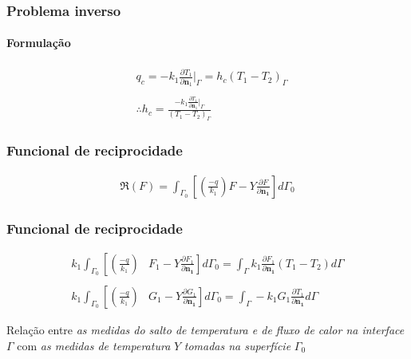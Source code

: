 \documentclass{beamer}
\begin{document}
\begin{frame}
	\frametitle{Problema inverso}
	\framesubtitle{Formulação}
	\begin{align*}
	& q_c = -k_1\frac{\partial T_1}{\partial \mathbf{n}_1}\bigg|_\Gamma
	=
	h_c(T_1 - T_2)_\Gamma \\ \\
	& \therefore h_c = \frac{-k_1\displaystyle\frac{\partial T_1}{\partial \mathbf{n}_1}\bigg|_\Gamma}{(T_1 - T_2)_\Gamma}
	\end{align*}
\end{frame}

\begin{frame}
	\frametitle{Funcional de reciprocidade}
	\begin{definition}{}
		\begin{align*}
		\Re(F) = \int_{\Gamma_0}\left[\left(\frac{-q}{k_1}\right)F - Y\frac{\partial F}{\partial\mathbf{n_1}}\right]d\Gamma_0
		\end{align*}
	\end{definition}
	
	\begin{center}
	\end{center}
	
	\begin{center}
	\end{center}	
\end{frame}

\begin{frame}
	\frametitle{Funcional de reciprocidade}
	
	\begin{corollary}
		\begin{align*}
		k_1\int_{\Gamma_0}\left[\left(\frac{-q}{k_1}\right)\right. & \left.F_1 - Y\frac{\partial F_1}{\partial\mathbf{n_1}}\right]d\Gamma_0
		=\int_\Gamma k_1 \frac{\partial F_1}{\partial\mathbf{n_1}}\left(T_1 - T_2\right)d\Gamma
		\label{identidade_T} \\ \nonumber \\
		k_1\int_{\Gamma_0}\left[\left(\frac{-q}{k_1}\right)\right. & \left.G_1 -  Y\frac{\partial G_1}{\partial\mathbf{n_1}}\right]d\Gamma_0
		= \int_\Gamma -k_1 G_1 \frac{\partial T_1}{\partial\mathbf{n_1}}d\Gamma
		\end{align*}
	\end{corollary}
	
	\begin{center}
	\end{center}
	
	\begin{alertblock}{}
	Relação entre \textit{as medidas
		do salto de temperatura e de fluxo de calor na interface} $\Gamma$ com \textit{as medidas de temperatura} $Y$ \textit{tomadas na superfície} $\Gamma_0$
	\end{alertblock}
\end{frame}
\end{document}
